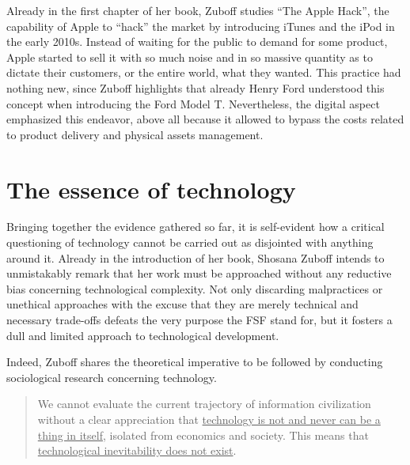 \documentclass[
  a4paper,
]{book}
\begin{document}
Already in the first chapter of her book, Zuboff studies ``The Apple Hack'', the capability of Apple to ``hack'' the market by introducing iTunes and the iPod in the early 2010s. Instead of waiting for the public to demand for some product, Apple started to sell it with so much noise and in so massive quantity as to dictate their customers, or the entire world, what they wanted. This practice had nothing new, since Zuboff highlights that already Henry Ford understood this concept when introducing the Ford Model T. Nevertheless, the digital aspect emphasized this endeavor, above all because it allowed to bypass the costs related to product delivery and physical assets management.

\hypertarget{the-essence-of-technology}{%
\section{The essence of technology}\label{the-essence-of-technology}}

Bringing together the evidence gathered so far, it is self-evident how a critical questioning of technology cannot be carried out as disjointed with anything around it. Already in the introduction of her book, Shosana Zuboff intends to unmistakably remark that her work must be approached without any reductive bias concerning technological complexity. Not only discarding malpractices or unethical approaches with the excuse that they are merely technical and necessary trade-offs defeats the very purpose the FSF stand for, but it fosters a dull and limited approach to technological development.

Indeed, Zuboff shares the theoretical imperative to be followed by conducting sociological research concerning technology.

\begin{quote}
We cannot evaluate the current trajectory of information civilization without a clear appreciation that \uline{technology is not and never can be a thing in itself}, isolated from economics and society. This means that \uline{technological inevitability does not exist}.
\end{quote}
\end{document}

